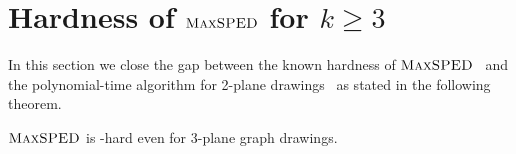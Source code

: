 \documentclass[a4paper,english,numberwithinsect]{eurocg18}
\newcommand{\martin}[1]{\todo[inline,color=blue!40]{MN: #1}}
\newcommand{\fabian}[1]{\todo[inline,color=pink!40]{FK: #1}}
\newcommand{\ped}{\ensuremath{\textsc{PED}}\xspace}
\newcommand{\maxsped}{\ensuremath{\textsc{MaxSPED}}\xspace}
\begin{document}
 

%
%

\section{Hardness of \maxsped for $k\ge3$}\label{sec:hardness}

In this section we close the gap between the known hardness of \maxsped~\cite{b-sgh-15} and the polynomial-time algorithm for 2-plane drawings~\cite{bcgkmn-pped-17} as stated in the following theorem.

\begin{theorem}\label{thm:hard}
	\maxsped is \NP-hard even for 3-plane graph drawings.
\end{theorem}
\end{document}
